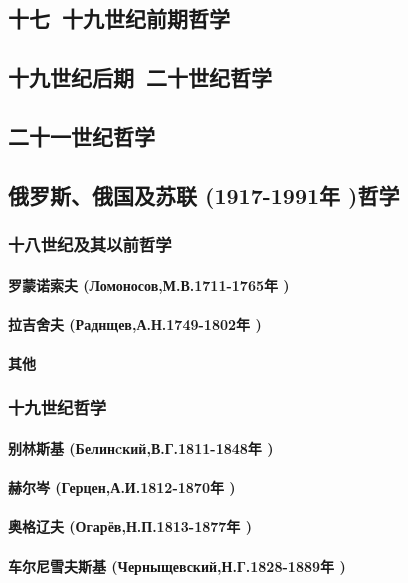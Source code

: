 \documentclass[UTF8]{../RepresentationUniverse}
\begin{document}
\subsection{十七~十九世纪前期哲学}
\subsection{十九世纪后期~二十世纪哲学}
\subsection{二十一世纪哲学}

\subsection{俄罗斯、俄国及苏联 (1917-1991年 )哲学}
\subsubsection{十八世纪及其以前哲学}
    \paragraph{罗蒙诺索夫 (Ломоносов,М.В.1711-1765年 )}
    \paragraph{拉吉舍夫 (Раднщев,А.Н.1749-1802年 )}
    \paragraph{其他}
\subsubsection{十九世纪哲学}
    \paragraph{别林斯基 (Белинcкий,В.Г.1811-1848年 )}
    \paragraph{赫尔岑 (Герцен,А.И.1812-1870年 )}
    \paragraph{奥格辽夫 (Огарёв,Н.П.1813-1877年 )}
    \paragraph{车尔尼雪夫斯基 (Черныщевский,Н.Г.1828-1889年 )}
\end{document}
